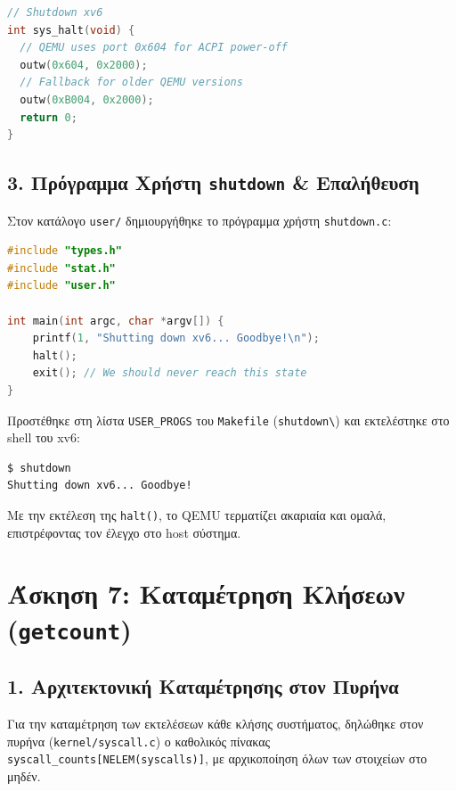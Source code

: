 \documentclass[11pt,a4paper]{article}
\begin{document}
\begin{lstlisting}[language=C, caption={Υλοποίηση sys\_halt στο kernel/sysproc.c}]
// Shutdown xv6
int sys_halt(void) {
  // QEMU uses port 0x604 for ACPI power-off
  outw(0x604, 0x2000);
  // Fallback for older QEMU versions
  outw(0xB004, 0x2000);
  return 0;
}
\end{lstlisting}

\subsection*{3. Πρόγραμμα Χρήστη \texttt{shutdown} \& Επαλήθευση}
Στον κατάλογο \texttt{user/} δημιουργήθηκε το πρόγραμμα χρήστη \texttt{shutdown.c}:

\begin{lstlisting}[language=C, caption={Πρόγραμμα χρήστη shutdown (user/shutdown.c)}]
#include "types.h"
#include "stat.h"
#include "user.h"

int main(int argc, char *argv[]) {
    printf(1, "Shutting down xv6... Goodbye!\n");
    halt();
    exit(); // We should never reach this state
}
\end{lstlisting}

Προστέθηκε στη λίστα \texttt{USER\_PROGS} του \texttt{Makefile} (\texttt{shutdown\textbackslash}) και εκτελέστηκε στο shell του xv6:

\begin{lstlisting}[style=termstyle, caption={Εκτέλεση της εντολής shutdown}]
$ shutdown
Shutting down xv6... Goodbye!
\end{lstlisting}
Με την εκτέλεση της \texttt{halt()}, το QEMU τερματίζει ακαριαία και ομαλά, επιστρέφοντας τον έλεγχο στο host σύστημα.

\clearpage
\section{Άσκηση 7: Καταμέτρηση Κλήσεων (\texttt{getcount})}

\subsection*{1. Αρχιτεκτονική Καταμέτρησης στον Πυρήνα}
Για την καταμέτρηση των εκτελέσεων κάθε κλήσης συστήματος, δηλώθηκε στον πυρήνα (\texttt{kernel/syscall.c}) 
ο καθολικός πίνακας \texttt{syscall\_counts[NELEM(syscalls)]}, με αρχικοποίηση όλων των στοιχείων στο μηδέν. 
\end{document}
